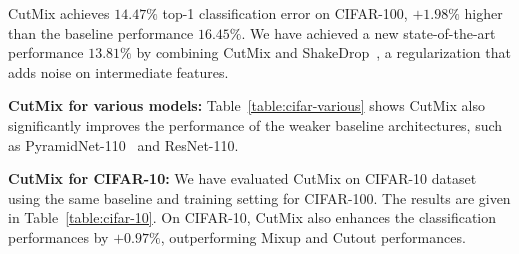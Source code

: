 {CutMix achieves $14.47\%$ top-1 classification error on CIFAR-100, $+1.98\%$ higher than the baseline performance $16.45\%$.}
{We have achieved a new state-of-the-art performance $13.81\%$ by combining CutMix and ShakeDrop~\cite{yamada2018shakedrop}, a regularization that adds noise on intermediate features.}


\noindent\textbf{CutMix for various models: }
Table~\ref{table:cifar-various} shows CutMix also significantly improves the performance of the weaker baseline architectures, such as PyramidNet-110~\cite{pyramidnet} and ResNet-110.


\noindent\textbf{CutMix for CIFAR-10: }
We have evaluated CutMix on CIFAR-10 dataset using the same baseline and training setting for CIFAR-100.
The results are given in Table~\ref{table:cifar-10}.
On CIFAR-10, CutMix also enhances the classification performances by $+0.97\%$, outperforming Mixup and Cutout performances. 